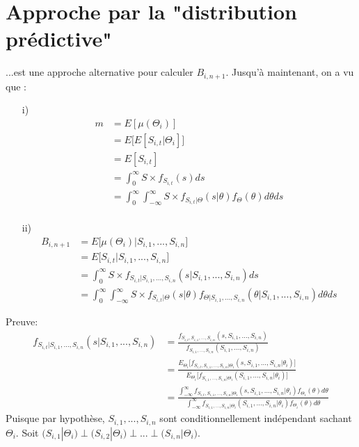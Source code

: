 \section{Approche par la "distribution prédictive"}
...est une approche alternative pour calculer $B_{i,n+1}$. Jusqu'à maintenant, on a vu que :
\begin{itemize}
\item[i)] \begin{align*}
m &=  E[\mu(\Theta_i)] \\
&= E\Big[E[S_{i,t}|\Theta_i] \Big] \\
&= E[S_{i,t}] \\
&= \int_{0}^{\infty} S \times f_{S_{i,t}}(s)ds \\
&= \int_{0}^{\infty} \int_{-\infty}^{\infty} S \times f_{S_{i,t}|\Theta}(s|\theta)f_{\Theta}(\theta) d\theta ds \\
\end{align*}

\item[ii)] \begin{align*}
B_{i,n+1} &= E \Big[ \mu(\Theta_i) | S_{i,1}, ..., S_{i,n}\Big] \\
&=  E \Big[S_{i,t} | S_{i,1}, ..., S_{i,n}\Big] \\
&= \int_{0}^{\infty} S \times f_{S_{i,t}|S_{i,1}, ..., S_{i,n}}(s|S_{i,1}, ..., S_{i,n})ds \\
&= \int_{0}^{\infty} \int_{-\infty}^{\infty}  S \times  f_{S_{i,t}|\Theta}(s|\theta) f_{\Theta|S_{i,1}, ..., S_{i,n}}(\theta|S_{i,1}, ..., S_{i,n})d\theta ds
\end{align*}
\end{itemize}
Preuve:
\begin{align*}
f_{S_{i,t}|S_{i,1}, ..., S_{i,n}}(s|S_{i,1}, ..., S_{i,n}) &= \frac{f_{S_{i,t},S_{i,1}, ..., S_{i,n}}(s,S_{i,1}, ..., S_{i,n})}{f_{S_{i,1}, ..., S_{i,n}}(S_{i,1}, ..., S_{i,n})} \\
&= \frac{E_{\Theta_i}\Big[f_{S_{i,t},S_{i,1}, ..., S_{i,n}|\Theta_i}(s,S_{i,1}, ..., S_{i,n}|\theta_i) \Big]}{E_{\Theta_i}\Big[f_{S_{i,1}, ..., S_{i,n}|\Theta_i}(S_{i,1}, ..., S_{i,n}|\theta_i)\Big]} \\
&= \frac{\int_{-\infty}^{\infty} f_{S_{i,t},S_{i,1}, ..., S_{i,n}|\Theta_i}(s,S_{i,1}, ..., S_{i,n}|\theta_i) f_{\Theta_i}(\theta)d\theta}{\int_{-\infty}^{\infty} f_{S_{i,1}, ..., S_{i,n}|\Theta_i}(S_{i,1}, ..., S_{i,n}|\theta_i) f_{\Theta_i}(\theta)d\theta} 
\end{align*}
Puisque par hypothèse, $S_{i,1}, ..., S_{i,n}$ sont conditionnellement indépendant sachant $\Theta_i$. Soit $\Big(S_{i,1}|\Theta_i \Big) \perp \Big(S_{i,2}|\Theta_i \Big) \perp ... \perp \Big(S_{i,n}|\Theta_i  \Big)$.
